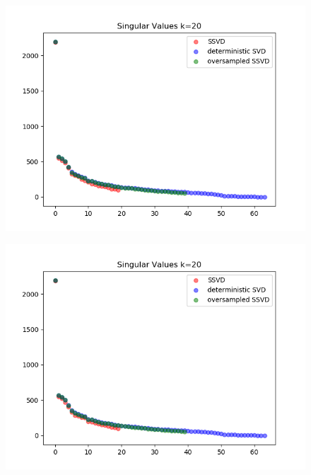 \documentclass[paper=a4, fontsize=11pt]{scrartcl} %
\numberwithin{figure}{section} %
\numberwithin{table}{section} %
\begin{document}
\begin{figure}[H]

\includegraphics{sing_values_3.png}
\end{figure}

\begin{figure}[H]

\includegraphics{sing_values_4.png}
\end{figure}
\end{document}
